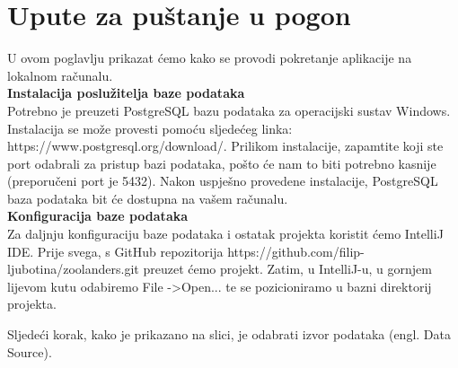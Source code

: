			\eject 
		
		\section{Upute za puštanje u pogon}
		
			U ovom poglavlju prikazat ćemo kako se provodi pokretanje aplikacije na lokalnom računalu.
			\\
			\textbf{Instalacija poslužitelja baze podataka}
			\\
			Potrebno je preuzeti PostgreSQL bazu podataka za operacijski sustav Windows. Instalacija se može provesti pomoću sljedećeg linka: https://www.postgresql.org/download/. Prilikom instalacije, zapamtite koji ste port odabrali za pristup bazi podataka, pošto će nam to biti potrebno kasnije (preporučeni port je 5432). Nakon uspješno provedene instalacije, PostgreSQL baza podataka bit će dostupna na vašem računalu.
			\\
			\textbf{Konfiguracija baze podataka}
			\\
			Za daljnju konfiguraciju baze podataka i ostatak projekta koristit ćemo IntelliJ IDE. Prije svega, s GitHub repozitorija https://github.com/filip-ljubotina/zoolanders.git preuzet ćemo projekt. Zatim, u IntelliJ-u, u gornjem lijevom kutu odabiremo File -\textgreater Open... te se pozicioniramo u bazni direktorij projekta.
			
			Sljedeći korak, kako je prikazano na slici, je odabrati izvor podataka (engl. Data Source).
			

